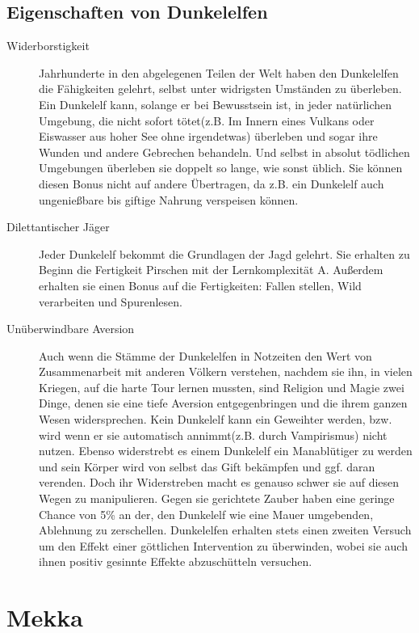 \documentclass[a4paper,12pt,oneside]{book}
\begin{document}
\subsection{Eigenschaften von Dunkelelfen}
\begin{description}
\item[Widerborstigkeit]
Jahrhunderte in den abgelegenen Teilen der Welt haben den Dunkelelfen die Fähigkeiten gelehrt, selbst unter widrigsten Umständen zu überleben. Ein Dunkelelf kann, solange er bei Bewusstsein ist, in jeder natürlichen Umgebung, die nicht sofort tötet(z.B. Im Innern eines Vulkans oder Eiswasser aus hoher See ohne irgendetwas) überleben und sogar ihre Wunden und andere Gebrechen behandeln. Und selbst in absolut tödlichen Umgebungen überleben sie doppelt so lange, wie sonst üblich. Sie können diesen Bonus nicht auf andere Übertragen, da z.B. ein Dunkelelf auch ungenießbare bis giftige Nahrung verspeisen können.

\item[Dilettantischer Jäger]
Jeder Dunkelelf bekommt die Grundlagen der Jagd gelehrt. Sie erhalten zu Beginn die Fertigkeit Pirschen mit der Lernkomplexität A. Außerdem erhalten sie einen Bonus auf die Fertigkeiten: Fallen stellen, Wild verarbeiten und Spurenlesen.

\item[Unüberwindbare Aversion]
Auch wenn die Stämme der Dunkelelfen in Notzeiten den Wert von Zusammenarbeit mit anderen Völkern verstehen, nachdem sie ihn, in vielen Kriegen, auf die harte Tour lernen mussten, sind Religion und Magie zwei Dinge, denen sie eine tiefe Aversion entgegenbringen und die ihrem ganzen Wesen widersprechen. Kein Dunkelelf kann ein Geweihter werden, bzw. wird wenn er sie automatisch annimmt(z.B. durch Vampirismus) nicht nutzen. Ebenso widerstrebt es einem Dunkelelf ein Manablütiger zu werden und sein Körper wird von selbst das Gift bekämpfen und ggf. daran verenden. Doch ihr Widerstreben macht es genauso schwer sie auf diesen Wegen zu manipulieren. Gegen sie gerichtete Zauber haben eine geringe Chance von 5\% an der, den Dunkelelf wie eine Mauer umgebenden, Ablehnung zu zerschellen. Dunkelelfen erhalten stets einen zweiten Versuch um den Effekt einer göttlichen Intervention zu überwinden, wobei sie auch ihnen positiv gesinnte Effekte abzuschütteln versuchen.
\end{description}

\section{Mekka}
\end{document}
